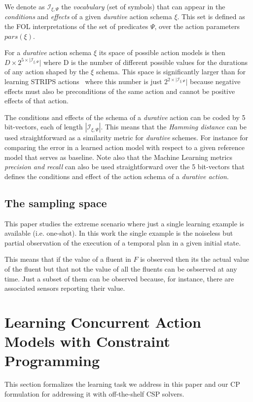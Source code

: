 \documentclass{ecai}
\begin{document}
We denote as ${\mathcal I}_{\xi,\Psi}$ the {\em vocabulary} (set of symbols) that can appear in the {\em conditions} and {\em effects} of a given {\em durative} action schema $\xi$. This set is defined as the FOL interpretations of the set of predicates $\Psi$, over the action parameters $pars(\xi)$.

For a {\em durative} action schema $\xi$ its space of possible action models is then $D\times 2^{5\times|{\mathcal I}_{\xi,\Psi}}|$ where D is the number of different possible values for the durations of any action shaped by the $\xi$ schema. This space is significantly larger than for learning STRIPS actions~\cite{yang2007learning} where this number is just $2^{2\times|{\mathcal I}_{\xi,\Psi}}|$ because negative effects must also be preconditions of the same action and cannot be positive effects of that action.

The conditions and effects of the schema of a {\em durative} action can be coded by 5 bit-vectors, each of length $|{\mathcal I}_{\xi,\Psi}|$. This means that the {\em Hamming distance} can be used straightforward as a similarity metric for {\em durative} schemes. For instance for comparing the error in a learned action model with respect to a given reference model that serves as baseline. Note also that the Machine Learning metrics {\em precision and recall} can also be used straightforward over the 5 bit-vectors that defines the conditions and effect of the action schema of a {\em durative action}.

\subsection{The sampling space}
\label{sec:sampling-space}
This paper studies the extreme scenario where just a single learning example is available (i.e. one-shot). In this work the single example is the noiseless but partial observation of the execution of a temporal plan in a given initial state.

This means that if the value of a fluent in $F$ is observed then its the actual value of the fluent but that not the value of all the fluents can be osbserved at any time. Just a subset of them can be observed because, for instance, there are associated sensors reporting their value. 



\section{Learning Concurrent Action Models with Constraint Programming}
This section formalizes the learning task we address in this paper and our CP formulation for addressing it with off-the-shelf CSP solvers.
\end{document}
